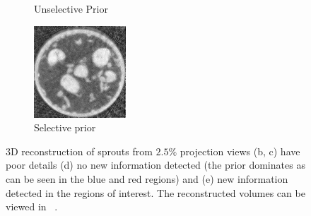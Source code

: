 \documentclass[journal]{IEEEtran}
\begin{document}
\begin{figure}[!h]
\begin{subfigure}[b]{0.3\linewidth}
        \caption{Unselective Prior}
     \end{subfigure}
\quad
    \begin{subfigure}[b]{0.3\linewidth}
        \includegraphics[width=\textwidth]{../images/sprouts/weightedPriorIm.png}
        \caption{Selective prior}
     \end{subfigure}
     \caption{3D reconstruction of sprouts from $2.5\%$ projection views
   (b, c) have poor details (d) no new information detected (the
   prior dominates as can be seen in the blue and red regions) and
   (e) new information detected in the regions of interest. The reconstructed volumes can be viewed in ~\cite{supp_paper}.} 
\label{fig:sprouts_3D_results}
\end{figure}

\end{document}

